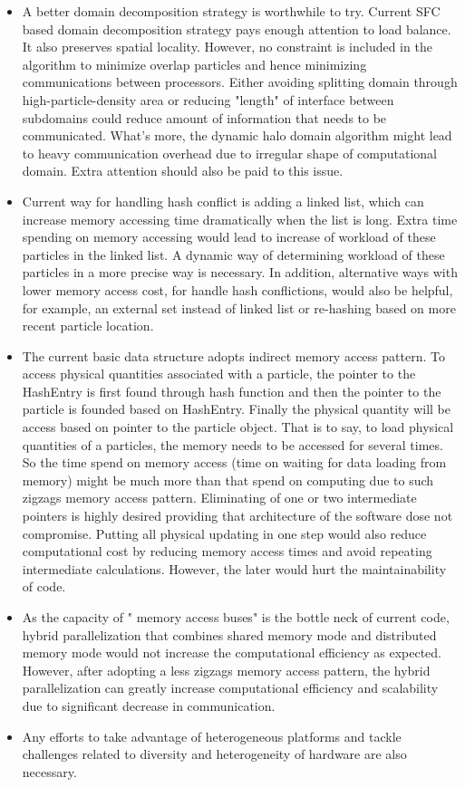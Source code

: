 \begin{itemize}
\item {A better domain decomposition strategy is worthwhile to try. Current SFC based domain decomposition strategy pays enough attention to load balance. It also preserves spatial locality. However, no constraint is included in the algorithm to minimize overlap particles and hence minimizing communications between processors. Either avoiding splitting domain through high-particle-density area or reducing "length" of interface between subdomains could reduce amount of information that needs to be communicated. What's more, the dynamic halo domain algorithm might lead to heavy communication overhead due to irregular shape of computational domain. Extra attention should also be paid to this issue.}
\item {Current way for handling hash conflict is adding a linked list, which can increase memory accessing time dramatically when the list is long. Extra time spending on memory accessing would lead to increase of workload of these particles in the linked list. A dynamic way of determining workload of these particles in a more precise way is necessary. In addition, alternative ways with lower memory access cost, for handle hash conflictions, would also be helpful, for example, an external set instead of linked list or re-hashing based on more recent particle location.}
\item {The current basic data structure adopts indirect memory access pattern. To access physical quantities associated with a particle, the pointer to the HashEntry is first found through hash function and then the pointer to the particle is founded based on HashEntry. Finally the physical quantity will be access based on pointer to the particle object. That is to say, to load physical quantities of a particles, the memory needs to be accessed for several times.
So the time spend on memory access (time on waiting for data loading from memory) might be much more than that spend on computing due to such zigzags memory access pattern. Eliminating of one or two intermediate pointers is highly desired providing that architecture of the software dose not compromise. Putting all physical updating in one step would also reduce computational cost by reducing memory access times and avoid repeating intermediate calculations. However, the later would hurt the maintainability of code.}
\item {As the capacity of " memory access buses" is the bottle neck of current code, hybrid parallelization that combines shared memory mode and distributed memory mode would not increase the computational efficiency as expected. However, after adopting a less zigzags memory access pattern, the hybrid parallelization can greatly increase computational efficiency and scalability due to significant decrease in communication.}
\item {Any efforts to take advantage of heterogeneous platforms and tackle challenges related to diversity and heterogeneity of hardware are also necessary.}
\end{itemize}

